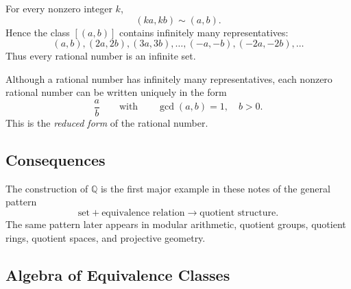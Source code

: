 \begin{remark}
\label{rem:rational-infinite-set}

For every nonzero integer $k$,
\[
(ka,kb)\sim(a,b).
\]
Hence the class $[(a,b)]$ contains infinitely many representatives:
\[
(a,b),(2a,2b),(3a,3b),\dots,(-a,-b),(-2a,-2b),\dots
\]
Thus every rational number is an infinite set.
\end{remark}

\begin{remark}
\label{rem:reduced-rational}

Although a rational number has infinitely many representatives, each nonzero rational number can be
written uniquely in the form
\[
\frac{a}{b}
\qquad\text{with}\qquad
\gcd(a,b)=1,
\quad b>0.
\]
This is the \emph{reduced form} of the rational number.

\end{remark}

\subsection{Consequences}

\begin{remark}
\label{rem:quotient-pattern}

The construction of $\mathbb{Q}$ is the first major example in these notes of the general pattern
\[
\text{set} + \text{equivalence relation} \longrightarrow \text{quotient structure}.
\]
The same pattern later appears in modular arithmetic, quotient groups, quotient rings, quotient
spaces, and projective geometry.

\end{remark}

\subsection{Algebra of Equivalence Classes}

